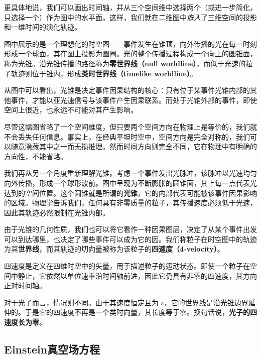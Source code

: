 \documentclass[../Main.tex]{subfiles}
\begin{document}
更具体地说，我们可以画出时间轴，并从三个空间维中选择两个（或进一步简化，只选择一个）作为图中的水平面。这样，我们就在二维图中\emph{嵌入}了三维空间的投影和一维时间的演化轨迹。


图中展示的是一个理想化的时空图——事件发生在锥顶，向外传播的光在每一时刻形成一个球面，其在图上投影为圆圈。光的整个传播过程构成一个向上的圆锥面，称为光锥。沿光锥传播的路径称为\textbf{零世界线（null worldline）}，而低于光速的粒子轨迹则位于锥内，形成\textbf{类时世界线（timelike worldline）}。

从图中可以看出，光锥是决定事件因果结构的核心：只有位于某事件光锥内部的其他事件，才能以亚光速信号与该事件产生因果联系。而处于光锥外部的事件，即使空间上很近，也永远不可能对其产生影响。

尽管这幅图省略了一个空间维度，但只要两个空间方向在物理上是等价的，我们就不会丢失任何信息。事实上，在经典平坦时空中，空间方向是完全对称的，我们可以随意隐藏其中之一而无损推理。然而时间方向则完全不同，它在物理中有明确的方向性，不能省略。

我们再从另一个角度重新理解光锥。考虑一个事件发出光脉冲，该脉冲以光速均匀向外传播，形成一个球形波前。图中呈现为不断膨胀的圆锥面，其上每一点代表光达到的空间位置。这个圆锥就是所谓的\textbf{光锥}，它的内部代表可能被该事件因果影响的区域。物理学告诉我们，任何具有非零质量的粒子，其传播速度必须低于光速，因此其轨迹必然限制在光锥内部。

由于光锥的几何性质，我们也可以将它看作一种因果图层，决定了从某个事件出发可以到达哪里，也决定了哪些事件可以成为它的因。我们称粒子在时空图中的轨迹为其\textbf{世界线}，而其轨迹的切向量被称为该粒子的\textbf{四速度（4-velocity）}。

四速度是定义在四维时空中的矢量，用于描述粒子的运动状态。即使一个粒子在空间中静止，它依然以单位速率沿时间轴前进，因此它仍具有非零的四速度，其方向正对时间轴。

对于光子而言，情况则不同。由于其速度恒定且为 $c$，它的世界线是沿光锥边界延伸的。于是它的四速度不再是一个类时向量，其长度等于零。换句话说，\textbf{光子的四速度长为零}。

\subsection{Einstein真空场方程}
\end{document}
